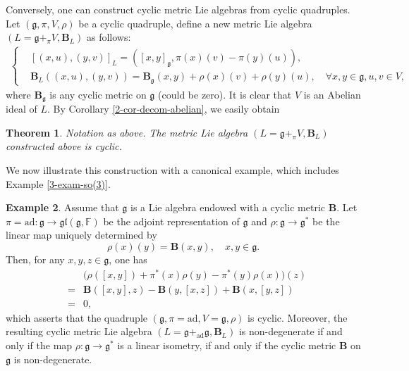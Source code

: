 \documentclass[reqno]{amsart}
\newtheorem{thm}{Theorem}[section]
\theoremstyle{definition}
\newtheorem{example}[thm]{Example}
\begin{document}
Conversely, one can construct cyclic metric Lie algebras from   cyclic quadruples.
Let $(\mathfrak{g},\pi,V,\rho)$ be a  cyclic quadruple, define a new metric Lie algebra
$(L=\mathfrak{g}+_{\pi}V,\mathbf{B}_{L})$ as follows:
\begin{eqnarray*}
\left\{
\begin{aligned}
&[(x,u),(y,v)]_{L}=([x,y]_{\mathfrak{g}},\pi(x)(v)-\pi(y)(u)),\\
&\mathbf{B}_{L}((x,u),(y,v))=\mathbf{B}_{\mathfrak{g}}(x,y)+\rho(x)(v)+\rho(y)(u),
\quad \forall x,y\in \mathfrak{g}, u,v\in V,
\end{aligned}
\right.
\end{eqnarray*}
where $\mathbf{B}_{\mathfrak{g}}$ is any cyclic metric on $\mathfrak{g}$ (could be zero).
 It is clear that $V$ is an Abelian ideal of $L$. By Corollary \ref{2-cor-decom-abelian}, we easily obtain
\begin{thm}\label{5.1-thm-gV}
Notation as above. The metric Lie algebra $(L=\mathfrak{g}+_{\pi}V,\mathbf{B}_{L})$ constructed above is cyclic.
\end{thm}
We now illustrate this construction with a canonical example, which includes Example \ref{3-exam-so(3)}.
\begin{example}\label{4-example-cyclic}
Assume that $\mathfrak{g}$ is a Lie algebra  endowed with a cyclic metric
$\mathbf{B}$.
Let $\pi=\mathrm{ad}: \mathfrak{g}\rightarrow \mathfrak{gl}(\mathfrak{g},\mathbb{F})$
be the adjoint representation of $\mathfrak{g}$ and $\rho:\mathfrak{g}\rightarrow \mathfrak{g}^{*}$
be the linear map uniquely determined by
$$\rho(x)(y)=\mathbf{B}(x,y),\quad x,y\in \mathfrak{g}.$$
Then, for any $x,y,z\in \mathfrak{g}$, one has
\begin{eqnarray*}
   &&  \Big(\rho([x,y])+\pi^{\ast}(x)\rho(y)-\pi^{\ast}(y)\rho(x)\Big)(z)\\
   &=&  \mathbf{B}([x,y],z)-\mathbf{B}(y,[x,z])+\mathbf{B}(x,[y,z])\\
   &=& 0,
\end{eqnarray*}
which asserts that the quadruple $(\mathfrak{g},\pi=\mathrm{ad},V=\mathfrak{g},\rho)$
is cyclic.
Moreover, the resulting cyclic metric Lie algebra $(L=\mathfrak{g}+_{\mathrm{ad}}\mathfrak{g},\mathbf{B}_{L})$ is non-degenerate if and only if the map $\rho:\mathfrak{g}\rightarrow \mathfrak{g}^{*}$ is a linear isometry, if and only if the cyclic metric $\mathbf{B}$ on $\mathfrak{g}$ is non-degenerate.
\end{example}
\end{document}

